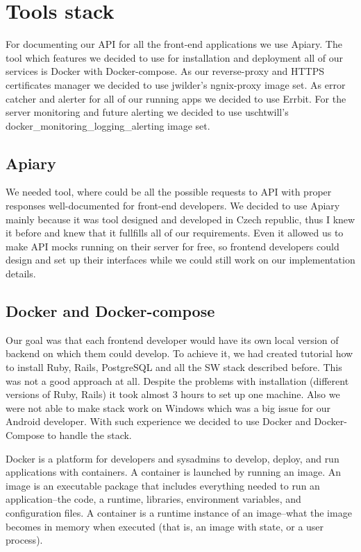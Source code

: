 \section{Tools stack}
For documenting our API for all the front-end applications we use Apiary.
The tool which features we decided to use for installation and deployment all of our services is Docker with Docker-compose. As our reverse-proxy and HTTPS certificates manager we decided to use jwilder's ngnix-proxy image set. As error catcher and alerter for all of our running apps we decided to use Errbit. For the server monitoring and future alerting we decided to use uschtwill's docker\_monitoring\_logging\_alerting image set. 
\subsection{Apiary}
We needed tool, where could be all the possible requests to API with proper responses well-documented for front-end developers. We decided to use Apiary mainly because it was tool designed and developed in Czech republic, thus I knew it before and knew that it fullfills all of our requirements. Even it allowed us to make API mocks running on their server for free, so frontend developers could design and set up their interfaces while we could still work on our implementation details.
\subsection{Docker and Docker-compose}
Our goal was that each frontend developer would have its own local version of backend on which them could develop. To achieve it, we had created tutorial how to install Ruby, Rails, PostgreSQL and all the SW stack described before. This was not a good approach at all. Despite the problems with installation (different versions of Ruby, Rails) it took almost 3 hours to set up one machine. Also we were not able to make stack work on Windows which was a big issue for our Android developer. With such experience we decided to use Docker and Docker-Compose to handle the stack.

Docker is a platform for developers and sysadmins to develop, deploy, and run applications with containers. A container is launched by running an image. An image is an executable package that includes everything needed to run an application--the code, a runtime, libraries, environment variables, and configuration files. A container is a runtime instance of an image--what the image becomes in memory when executed (that is, an image with state, or a user process).\cite{docker_def}


